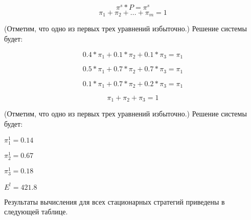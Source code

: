 \documentclass[14pt,a4paper,report]{report}
\begin{document}
$$ \pi^s * P = \pi^s $$
$$ \pi_1 + \pi_2  + ... + \pi_m = 1 $$


	(Отметим, что одно из первых трех уравнений избыточно.) Решение системы будет:
	
	$$ 0.4*\pi_1 +  0.1* \pi_2 + 0.1* \pi_3 = \pi_1 $$

	$$ 0.5*\pi_1 +  0.7* \pi_2 + 0.7* \pi_3 = \pi_1 $$

	$$ 0.1*\pi_1 +  0.7* \pi_2 + 0.2* \pi_3 = \pi_1 $$

	$$ \pi_1+ \pi_2 + \pi_3 = 1 $$

(Отметим, что одно из первых трех уравнений избыточно.) Решение системы будет:

$\pi_1^1 = 0.14$  

$\pi_2^1 = 0.67$  

$\pi_3^1 = 0.18 $

$ E^! = 421.8$
	
	Результаты вычисления для всех стационарных стратегий приведены в следующей таблице.
	
\end{document}
